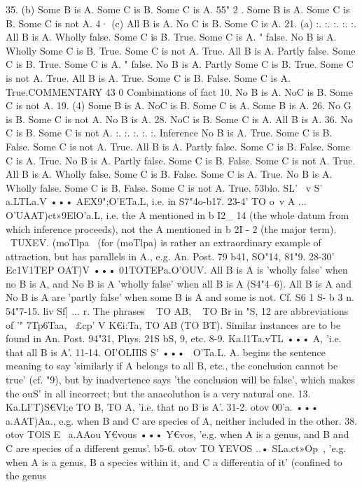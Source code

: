 35. (b) Some B is A.
Some C is B.
Some C is A.
55" 2 . Some B is A.
Some C is B.
Some C is not A.
4· (c) All B is A.
No C is B.
Some C is A.
21. (a)
:.
:.
:.
:.
:.
All B is A. Wholly false.
Some C is B. True.
Some C is A.
" false.
No B is A. Wholly
Some C is B. True.
Some C is not A. True.
All B is A. Partly false.
Some C is B. True.
Some C is A.
" false.
No B is A. Partly
Some C is B. True.
Some C is not A. True.
All B is A. True.
Some C is B. False.
Some C is A. True.COMMENTARY
43 0
Combinations of fact
10.
No B is A.
NoC is B.
Some C is not A.
19. (4) Some B is A.
NoC is B.
Some C is A.
Some B is A.
26.
No G is B.
Some C is not A.
No B is A.
28.
NoC is B.
Some C is A.
All B is A.
36.
No C is B.
Some C is not A.
:.
:.
:.
:.
:.
Inference
No B is A. True.
Some C is B. False.
Some C is not A. True.
All B is A. Partly false.
Some C is B. False.
Some C is A. True.
No B is A. Partly false.
Some C is B. False.
Some C is not A. True.
All B is A. Wholly false.
Some C is B. False.
Some C is A. True.
No B is A. Wholly false.
Some C is B. False.
Some C is not A. True.
53blo. SL' ~v S' a.LTLa.V ••• AEX9";O'ETa.L, i.e. in S7"4o-b17.
23-4' TO o~v A ... O'UAAT)ct»9ElO'a.L, i.e. the A mentioned in b I2_
14 (the whole datum from which inference proceeds), not the A
mentioned in
b 2I - 2
(the major term).
~TUXEV. (moTlpa~ (for (moTlpa) is
rather an extraordinary example of attraction, but has parallels
in A., e.g. An. Post. 79 b41, SO"14, 81"9.
28-30' Ec1V1TEP OAT)V ••• 01TOTEPa.O'OUV. All B is A is 'wholly
false' when no B is A, and No B is A 'wholly false' when all B is
A (S4"4--6). All B is A and No B is A are 'partly false' when
some B is A and some is not. Cf. S6 1 S- b 3 n.
54"7-15. liv Sf] ... r. The phrases ~ TO AB, ~ TO Br in "S, 12
are abbreviations of '" 7Tp6Taa,~ £cp' V K€i:Ta, TO AB (TO BT). Similar
instances are to be found in An. Post. 94"31, Phys. 21S bS, 9, etc.
8-9. Ka.l1Ta.vTL ••• A, 'i.e. that all B is A'.
11-14. OI'OLIIlS S' ••• ~O'Ta.L. A. begins the sentence meaning to
say 'similarly if A belongs to all B, etc., the conclusion cannot be
true' (cf. "9), but by inadvertence says 'the conclusion will be
false', which makes the ouS' in all incorrect; but the anacoluthon
is a very natural one.
13. Ka.LI'T)S€Vl;e TO B, TO A, 'i.e. that no B is A'.
31-2. otov 00'a. ••• a.AAT)Aa., e.g. when B and C are species of
A, neither included in the other.
38. otov TOlS E~ a.AAou Y€vous ••• Y€vos, 'e.g. when A is a
genus, and B and C are species of a different genus'.
b5-6. otov TO YEVOS ..• SLa.ct»Op~, 'e.g. when A is a genus, B a
species within it, and C a differentia of it' (confined to the genus

